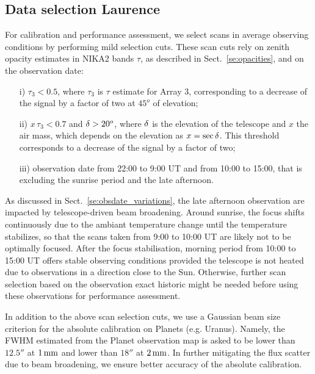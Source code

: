 


\subsection{Data selection {\color{YellowGreen} Laurence}}
\label{se:data_selection}

For calibration and performance assessment, we select scans in average
observing conditions by performing mild selection cuts. These scan
cuts rely on zenith opacity estimates in NIKA2 bands $\tau$, as
described in Sect.~\ref{se:opacities}, and on the observation date:
%
\begin{itemize}
\item[i)] $\tau_{3} < 0.5$, where $\tau_{3}$ is $\tau$ estimate for
  Array 3, corresponding to a decrease of the signal by a factor of
  two at $45^{o}$ of elevation;
\item[ii)] $x\, \tau_{3} < 0.7$ and $\delta > 20^{o}$, where $\delta$ is the
  elevation of the telescope and $x$ the
  air mass, which depends on the elevation as $x=\sec \delta$. This
  threshold corresponds to a decrease of the signal by a factor of two;
\item[iii)] observation date from 22:00 to 9:00 UT and from 10:00 to
  15:00, that is excluding the sunrise period and the late afternoon.
\end{itemize}
%
As discussed in Sect.~\ref{se:obsdate_variations}, the late afternoon
observation are impacted by telescope-driven beam broadening. Around
sunrise, the focus shifts continuously due to the ambiant temperature
change until the temperature stabilizes, so that the scans taken from
9:00 to 10:00 UT are likely not to be optimally focused.
After the focus stabilisation, morning period 
from 10:00 to 15:00 UT offers stable observing conditions
provided the telescope is not heated due to observations in a
direction close to the Sun.  Otherwise, further scan selection based on the
observation exact historic might be needed before using these
observations for performance assessment.

   
In addition to the above scan selection cuts, we use a Gaussian beam
size criterion for the absolute calibration on Planets
(e.g. Uranus). Namely, the FWHM estimated from the Planet observation
map is asked to be lower than $12.5''$ at $1\,\rm{mm}$ and lower than $18''$ at
$2\,\rm{mm}$. In further mitigating the flux scatter due to beam broadening, we
ensure better accuracy of the absolute calibration.  




